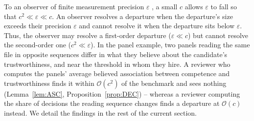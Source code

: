 \documentclass[a4paper,fleqn]{cas-sc}
\theoremstyle{remark}
\theoremstyle{definition}
\newcommand{\bigO}{\mathcal{O}}
\begin{document}
To an observer of finite measurement precision $\varepsilon$ , a small $c$ allows $\varepsilon$ to fall so that $c^{2}\ll\varepsilon\ll c$. An observer resolves a departure when the departure's size exceeds their precision $\varepsilon$ and cannot resolve it when the departure sits below $\varepsilon$. Thus, the observer may resolve a first-order departure ($\varepsilon \ll c$) but cannot resolve the second-order one ($ c^2 \ll \varepsilon$). In the panel example, two panels reading the same file in opposite sequences differ in what they believe about the candidate's trustworthiness, and near the threshold in whom they hire. A reviewer who computes the panels' average believed association between competence and trustworthiness finds it within $\bigO(c^{2})$ of the benchmark and sees nothing (Lemma~\ref{lem:ASC}, Proposition~\ref{prop:DEC}) -- whereas a reviewer computing the share of decisions the reading sequence changes finds a departure at $\bigO(c)$ instead. We detail the findings in the rest of the current section.
\end{document}
